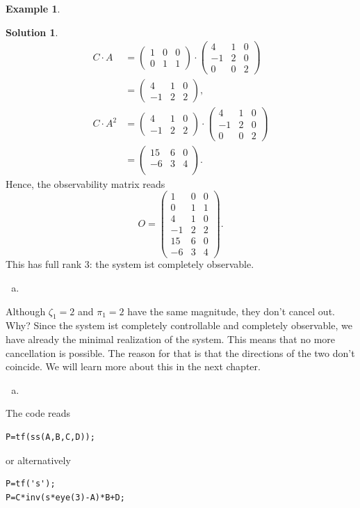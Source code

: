 \documentclass[a4paper,12 pt]{article}
\numberwithin{equation}{section}
\theoremstyle{definition}
\newtheorem{bsp}{Example}
\theoremstyle{remark}
\theoremstyle{definition}
\newtheorem*{lsg}{Solution}
\theoremstyle{definition}
\theoremstyle{definition}
\theoremstyle{remark}
\begin{document}
\begin{bsp}
\begin{lsg}
\begin{equation*}
\begin{split}
C\cdot A&=\begin{pmatrix} 1&0&0\\ 0&1&1\end{pmatrix} \cdot \begin{pmatrix}
4&1&0\\
-1&2&0\\
0&0&2
\end{pmatrix}\\
&=\begin{pmatrix}
4&1&0\\
-1&2&2
\end{pmatrix},\\
C\cdot A^2&=\begin{pmatrix}
4&1&0\\
-1&2&2
\end{pmatrix}\cdot \begin{pmatrix}
4&1&0\\
-1&2&0\\
0&0&2
\end{pmatrix} \\
&=\begin{pmatrix}
15&6&0\\
-6&3&4\\
\end{pmatrix}.
\end{split}
\end{equation*}
Hence, the observability matrix reads
\begin{equation*}
O=\begin{pmatrix}
1&0&0\\
0&1&1\\
4&1&0\\
-1&2&2\\
15&6&0\\
-6&3&4
\end{pmatrix}.
\end{equation*}
This has full rank 3: the system ist completely observable.
\begin{enumerate}[(d)]
\item
\end{enumerate}
Although $\zeta_1=2$ and $\pi_1=2$ have the same magnitude, they don't cancel out. Why? Since the system ist completely controllable and completely observable, we have already the minimal realization of the system. This means that no more cancellation is possible. The reason for that is that the directions of the two don't coincide. We will learn more about this in the next chapter.
\begin{enumerate}[(e)]
\item
\end{enumerate}
The code reads
\begin{verbatim}
P=tf(ss(A,B,C,D));
\end{verbatim}
or alternatively
\begin{verbatim}
P=tf('s');
P=C*inv(s*eye(3)-A)*B+D;
\end{verbatim}

\end{lsg}

\end{bsp}
\end{document}
